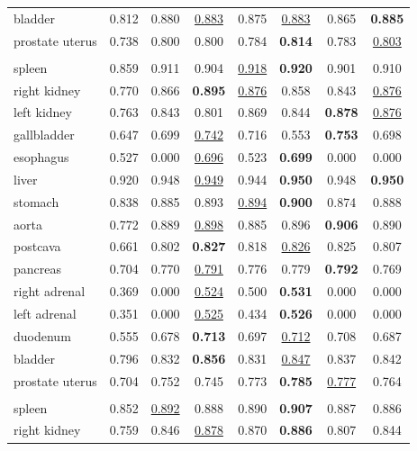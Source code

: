 \begin{minipage}{\textwidth}
{\begin{tabular}{@{}lccccccc@{}}
bladder & 0.812 & 0.880 & \underline{0.883} & 0.875 & \underline{0.883} & 0.865 & \textbf{0.885} \\
prostate uterus & 0.738 & 0.800 & 0.800 & 0.784 & \textbf{0.814} & 0.783 & \underline{0.803} \\
\addlinespace
\multicolumn{8}{@{}l}{\textit{joint}} \\
spleen & 0.859 & 0.911 & 0.904 & \underline{0.918} & \textbf{0.920} & 0.901 & 0.910 \\
right kidney & 0.770 & 0.866 & \textbf{0.895} & \underline{0.876} & 0.858 & 0.843 & \underline{0.876} \\
left kidney & 0.763 & 0.843 & 0.801 & 0.869 & 0.844 & \textbf{0.878} & \underline{0.876} \\
gallbladder & 0.647 & 0.699 & \underline{0.742} & 0.716 & 0.553 & \textbf{0.753} & 0.698 \\
esophagus & 0.527 & 0.000 & \underline{0.696} & 0.523 & \textbf{0.699} & 0.000 & 0.000 \\
liver & 0.920 & 0.948 & \underline{0.949} & 0.944 & \textbf{0.950} & 0.948 & \textbf{0.950} \\
stomach & 0.838 & 0.885 & 0.893 & \underline{0.894} & \textbf{0.900} & 0.874 & 0.888 \\
aorta & 0.772 & 0.889 & \underline{0.898} & 0.885 & 0.896 & \textbf{0.906} & 0.890 \\
postcava & 0.661 & 0.802 & \textbf{0.827} & 0.818 & \underline{0.826} & 0.825 & 0.807 \\
pancreas & 0.704 & 0.770 & \underline{0.791} & 0.776 & 0.779 & \textbf{0.792} & 0.769 \\
right adrenal & 0.369 & 0.000 & \underline{0.524} & 0.500 & \textbf{0.531} & 0.000 & 0.000 \\
left adrenal & 0.351 & 0.000 & \underline{0.525} & 0.434 & \textbf{0.526} & 0.000 & 0.000 \\
duodenum & 0.555 & 0.678 & \textbf{0.713} & 0.697 & \underline{0.712} & 0.708 & 0.687 \\
bladder & 0.796 & 0.832 & \textbf{0.856} & 0.831 & \underline{0.847} & 0.837 & 0.842 \\
prostate uterus & 0.704 & 0.752 & 0.745 & 0.773 & \textbf{0.785} & \underline{0.777} & 0.764 \\
\addlinespace
\multicolumn{8}{@{}l}{\textit{joint (8000 steps)}} \\
spleen & 0.852 & \underline{0.892} & 0.888 & 0.890 & \textbf{0.907} & 0.887 & 0.886 \\
right kidney & 0.759 & 0.846 & \underline{0.878} & 0.870 & \textbf{0.886} & 0.807 & 0.844 \\

\end{tabular}}
\end{minipage}

